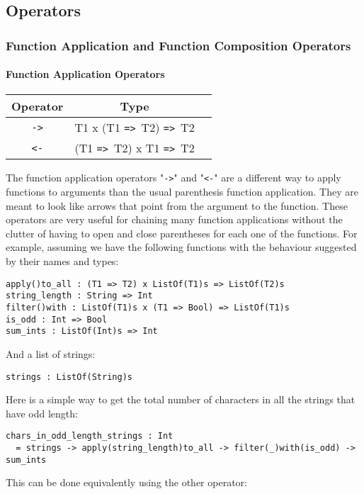 \documentclass{article}
\def\ra{\texttt{=>}\ }
\begin{document}
\subsection{Operators}

\subsubsection{Function Application and Function Composition Operators}

\paragraph{Function Application Operators}

\begin{center}
\begin{tabular}{ |c|c|c| } 
\hline
Operator & Type
\\ 
\hline
\hline
\texttt{->} & T1 x (T1 \ra T2) \ra T2
\\
\hline
\texttt{<-} & (T1 \ra T2) x T1 \ra T2
\\
\hline
\end{tabular}
\end{center}
The function application operators "\texttt{->}" and "\texttt{<-}" are a
different way to apply functions to arguments than the usual parenthesis
function application.  They are meant to look like arrows that point from the
argument to the function.  These operators are very useful for chaining many
function applications without the clutter of having to open and close
parentheses for each one of the functions.  For example, assuming we have the
following functions with the behaviour suggested by their names and types:
\begin{verbatim}
apply()to_all : (T1 => T2) x ListOf(T1)s => ListOf(T2)s
string_length : String => Int
filter()with : ListOf(T1)s x (T1 => Bool) => ListOf(T1)s
is_odd : Int => Bool
sum_ints : ListOf(Int)s => Int
\end{verbatim}
And a list of strings:
\begin{verbatim}
strings : ListOf(String)s
\end{verbatim}
Here is a simple way to get the total number of characters in all the strings
that have odd length:
\begin{verbatim}
chars_in_odd_length_strings : Int
  = strings -> apply(string_length)to_all -> filter(_)with(is_odd) -> sum_ints
\end{verbatim}
This can be done equivalently using the other operator:
\end{document}
